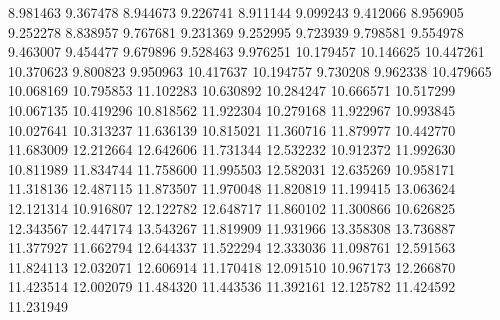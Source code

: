 8.981463
9.367478
8.944673
9.226741
8.911144
9.099243
9.412066
8.956905
9.252278
8.838957
9.767681
9.231369
9.252995
9.723939
9.798581
9.554978
9.463007
9.454477
9.679896
9.528463
9.976251
10.179457
10.146625
10.447261
10.370623
9.800823
9.950963
10.417637
10.194757
9.730208
9.962338
10.479665
10.068169
10.795853
11.102283
10.630892
10.284247
10.666571
10.517299
10.067135
10.419296
10.818562
11.922304
10.279168
11.922967
10.993845
10.027641
10.313237
11.636139
10.815021
11.360716
11.879977
10.442770
11.683009
12.212664
12.642606
11.731344
12.532232
10.912372
11.992630
10.811989
11.834744
11.758600
11.995503
12.582031
12.635269
10.958171
11.318136
12.487115
11.873507
11.970048
11.820819
11.199415
13.063624
12.121314
10.916807
12.122782
12.648717
11.860102
11.300866
10.626825
12.343567
12.447174
13.543267
11.819909
11.931966
13.358308
13.736887
11.377927
11.662794
12.644337
11.522294
12.333036
11.098761
12.591563
11.824113
12.032071
12.606914
11.170418
12.091510
10.967173
12.266870
11.423514
12.002079
11.484320
11.443536
11.392161
12.125782
11.424592
11.231949
